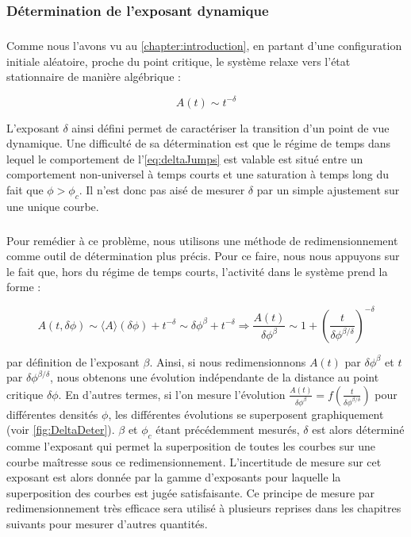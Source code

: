 \subsubsection{Détermination de l'exposant dynamique}

\subparagraph{}Comme nous l'avons vu au \autoref{chapter:introduction}, en partant d'une configuration initiale aléatoire, proche du point critique, le système relaxe vers l'état stationnaire de manière algébrique :

\begin{equation}
	A(t) \sim t^{-\delta}
	\label{eq:deltaJumps}
\end{equation}

\noindent L'exposant $\delta$ ainsi défini permet de caractériser la transition d'un point de vue dynamique. Une difficulté de sa détermination est que le régime de temps dans lequel le comportement de l'\autoref{eq:deltaJumps} est valable est situé entre un comportement non-universel à temps courts et une saturation à temps long du fait que $\phi>\phi_c$. Il n'est donc pas aisé de mesurer $\delta$ par un simple ajustement sur une unique courbe. 

\subparagraph{}Pour remédier à ce problème, nous utilisons une méthode de redimensionnement comme outil de détermination plus précis. Pour ce faire, nous nous appuyons sur le fait que, hors du régime de temps courts, l'activité dans le système prend la forme :

\begin{equation}
	A(t, \delta\phi) \sim \langle A \rangle (\delta\phi) + t^{-\delta} \sim \delta\phi^\beta + t^{-\delta} \Rightarrow \frac{A(t)}{\delta\phi^\beta} \sim 1 + \left(\frac{t}{\delta\phi^{\beta/\delta}}\right)^{-\delta}
\end{equation}

\noindent par définition de l'exposant $\beta$. Ainsi, si nous redimensionnons $A(t)$ par $\delta\phi^\beta$ et $t$ par $\delta\phi^{\beta/\delta}$, nous obtenons une évolution indépendante de la distance au point critique $\delta\phi$. En d'autres termes, si l'on mesure l'évolution $\frac{A(t)}{\delta\phi^\beta} = f \left(\frac{t}{\delta\phi^{\beta/\delta}} \right)$ pour différentes densités $\phi$, les différentes évolutions se superposent graphiquement (voir \autoref{fig:DeltaDeter}). $\beta$ et $\phi_c$ étant précédemment mesurés, $\delta$ est alors déterminé comme l'exposant qui permet la superposition de toutes les courbes sur une courbe maîtresse sous ce redimensionnement. L'incertitude de mesure sur cet exposant est alors donnée par la gamme d'exposants pour laquelle la superposition des courbes est jugée satisfaisante. Ce principe de mesure par redimensionnement très efficace sera utilisé à plusieurs reprises dans les chapitres suivants pour mesurer d'autres quantités.

